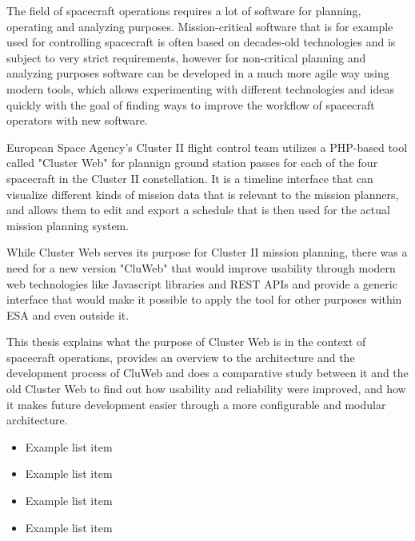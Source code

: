 The field of spacecraft operations requires a lot of software for planning, operating and analyzing purposes. Mission-critical software that is for example used for controlling spacecraft is often based on decades-old technologies and is subject to very strict requirements, however for non-critical planning and analyzing purposes software can be developed in a much more agile way using modern tools, which allows experimenting with different technologies and ideas quickly with the goal of finding ways to improve the workflow of spacecraft operators with new software.

European Space Agency's Cluster II flight control team utilizes a PHP-based tool called "Cluster Web" for plannign ground station passes for each of the four spacecraft in the Cluster II constellation. It is a timeline interface that can visualize different kinds of mission data that is relevant to the mission planners, and allows them to edit and export a schedule that is then used for the actual mission planning system.

While Cluster Web serves its purpose for Cluster II mission planning, there was a need for a new version "CluWeb" that would improve usability through modern web technologies like Javascript libraries and REST APIs and provide a generic interface that would make it possible to apply the tool for other purposes within ESA and even outside it.

This thesis explains what the purpose of Cluster Web is in the context of spacecraft operations, provides an overview to the architecture and the development process of CluWeb and does a comparative study between it and the old Cluster Web to find out how usability and reliability were improved, and how it makes future development easier through a more configurable and modular architecture. \cite{kamara, al-shaer}


\begin{itemize}
\item Example list item
\item Example list item
\item Example list item
\item Example list item
\end{itemize}


